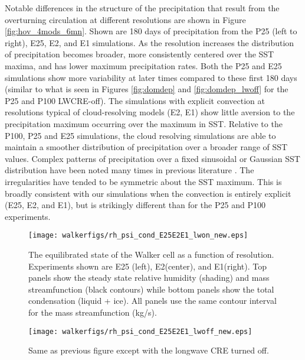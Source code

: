 \documentclass[draft]{agujournal2019}
\begin{document}
{Notable differences in the structure of the precipitation that result from the overturning circulation at different resolutions are shown in Figure \ref{fig:hov_4mods_6mn}.  
Shown are 180 days of precipitation from the P25 (left to right), E25, E2, and E1 simulations.  
As the resolution increases the distribution of precipitation becomes broader, more consistently centered over the SST maxima, and has 
lower maximum precipitation rates.  
Both the P25 and E25 simulations show more variability at later times compared to these 
first 180 days (similar to what is seen in Figures \ref{fig:domdep}  and \ref{fig:domdep_lwoff} for the P25 and P100 LWCRE-off).  
The simulations with explicit convection at resolutions typical of cloud-resolving models 
(E2, E1) show little aversion to the precipitation maximum occurring over the maximum in SST.
Relative to the P100, P25 and E25 simulations, the cloud resolving simulations are able to maintain a smoother distribution of 
precipitation over a broader range of SST values.  Complex patterns of precipitation over a fixed sinusoidal or Gaussian SST distribution 
have been noted many times in previous literature \cite{Grabowski2000,Bretherton_etal_2006, Wofsy_Kuang_2012,Jeevanjee_etal_2017}. 
The irregularities have tended to be symmetric about the SST maximum.  This is broadly consistent 
with our simulations when the convection is entirely explicit (E25, E2, and E1), but is strikingly different than for the P25 and P100 experiments. 

\begin{figure}
  \centering
      \texttt{[image: walkerfigs/rh\_psi\_cond\_E25E2E1\_lwon\_new.eps]}
      \caption{The equilibrated state of the Walker cell as a function of resolution.  
      Experiments shown are E25 (left), E2(center), and E1(right). Top panels show the 
      steady state relative humidity (shading) and mass streamfunction (black contours)
      while bottom panels show the total condensation (liquid + ice).  
      All panels use the same contour interval for the 
      mass streamfunction (kg/s).}
  \label{fig:rh_psi_P25E2E1}
\end{figure}


\begin{figure}
  \centering
      \texttt{[image: walkerfigs/rh\_psi\_cond\_E25E2E1\_lwoff\_new.eps]}
          \caption{Same as previous figure except with the longwave CRE turned off.}
  \label{fig:rh_psi_P25E2E1_lwoff}
\end{figure}


}
\end{document}
